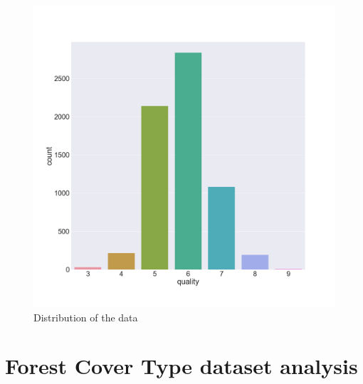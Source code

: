 \documentclass{article}
\begin{document}

\begin{figure} [H]
    \includegraphics[width=1\textwidth]{Figures/instances.png}
\caption{Distribution of the data}
\end{figure}

\section{Forest Cover Type dataset analysis}
\label{Annexe_ForestAnalysis}

    
\end{document}
